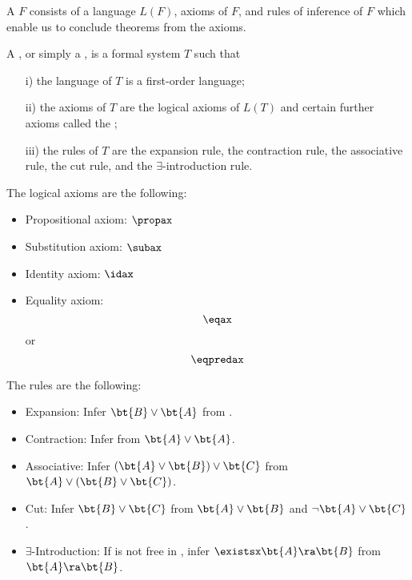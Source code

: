 \begin{definition}
	A  $F$ consists of a language $L(F)$, axioms 
	of $F$, and rules of inference of $F$ which enable us to 
	conclude theorems from the axioms.
\end{definition}

\begin{definition}
	A , or 
	simply a , is a formal system $T$ such that
	\begin{enumerate}
		\item[i)] the language of $T$ is a first-order language;
		
		\item[ii)] the axioms of $T$ are the logical axioms of 
		$L(T)$ and certain further axioms called the ;
		
		\item[iii)] the rules of $T$ are the expansion rule, the 
		contraction rule, the associative rule, the cut rule, and 
		the $\exists$-introduction rule.
	\end{enumerate}
\end{definition}

The logical axioms are the following:
\begin{itemize}
	\item Propositional axiom: $\propax$
	
	\item Substitution axiom: $\subax$
	
	\item Identity axiom: $\idax$
	
	\item Equality axiom: 
	\[ \eqax \] or \[ \eqpredax \]
\end{itemize}

The rules are the following:
\begin{itemize}
	\item Expansion: Infer $\bt{B} \lor {}$ from \bt{A}.
	
	\item Contraction: Infer  from $\bt{A} \lor \bt{A}$.
	
	\item Associative: Infer $(\bt{A} \lor \bt{B}) \lor \bt{C}$ 
	from $\bt{A} \lor (\bt{B} \lor \bt{C})$.
	
	\item Cut: Infer $\bt{B} \lor \bt{C}$ from $\bt{A} \lor \bt{B}$ 
	and $\neg \bt{A} \lor \bt{C}$.
	
	\item $\exists$-Introduction: If  is not free in , 
	infer $\existsx \bt{A} \ra \bt{B}$ from $\bt{A} \ra \bt{B}$.
\end{itemize}

